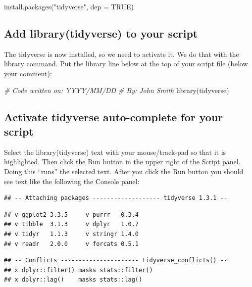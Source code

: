 \documentclass[
]{krantz}
\makeatletter
\newenvironment{Shaded}{\begin{snugshade}}{\end{snugshade}}
\newcommand{\AttributeTok}[1]{\textcolor[rgb]{0.61,0.61,0.61}{#1}}
\newcommand{\CommentTok}[1]{\textcolor[rgb]{0.37,0.37,0.37}{\textit{#1}}}
\newcommand{\ConstantTok}[1]{\textcolor[rgb]{0,0,0}{#1}}
\newcommand{\FunctionTok}[1]{\textcolor[rgb]{0,0,0}{#1}}
\newcommand{\NormalTok}[1]{#1}
\newcommand{\StringTok}[1]{\textcolor[rgb]{0.5,0.5,0.5}{#1}}
\newenvironment{kframe}{%
\medskip{}
\setlength{\fboxsep}{.8em}
 \def\at@end@of@kframe{}%
 \ifinner\ifhmode%
  \def\at@end@of@kframe{\end{minipage}}%
  \begin{minipage}{\columnwidth}%
 \fi\fi%
 \def\FrameCommand##1{\hskip\@totalleftmargin \hskip-\fboxsep
 \colorbox{shadecolor}{##1}\hskip-\fboxsep
     \hskip-\linewidth \hskip-\@totalleftmargin \hskip\columnwidth}%
 \MakeFramed {\advance\hsize-\width
   \@totalleftmargin\z@ \linewidth\hsize
   \@setminipage}}%
 {\par\unskip\endMakeFramed%
 \at@end@of@kframe}
\renewenvironment{Shaded}{\begin{kframe}}{\end{kframe}}
\makeatother
\begin{document}
\begin{Shaded}
\begin{Highlighting}[]
\FunctionTok{install.packages}\NormalTok{(}\StringTok{"tidyverse"}\NormalTok{, }\AttributeTok{dep =} \ConstantTok{TRUE}\NormalTok{)}
\end{Highlighting}
\end{Shaded}

\hypertarget{add-librarytidyverse-to-your-script}{%
\subsection{Add library(tidyverse) to your script}\label{add-librarytidyverse-to-your-script}}

The tidyverse is now installed, so we need to activate it. We do that with the library command. Put the library line below at the top of your script file (below your comment):

\begin{Shaded}
\begin{Highlighting}[]
\CommentTok{\# Code written on: YYYY/MM/DD }
\CommentTok{\# By: John Smith}
\FunctionTok{library}\NormalTok{(tidyverse)}
\end{Highlighting}
\end{Shaded}

\hypertarget{activate-tidyverse-auto-complete-for-your-script}{%
\subsection{Activate tidyverse auto-complete for your script}\label{activate-tidyverse-auto-complete-for-your-script}}

Select the library(tidyverse) text with your mouse/track-pad so that it is highlighted. Then click the Run button in the upper right of the Script panel. Doing this ``runs'' the selected text. After you click the Run button you should see text like the following the Console panel:

\begin{verbatim}
## -- Attaching packages ------------------- tidyverse 1.3.1 --
\end{verbatim}

\begin{verbatim}
## v ggplot2 3.3.5     v purrr   0.3.4
## v tibble  3.1.3     v dplyr   1.0.7
## v tidyr   1.1.3     v stringr 1.4.0
## v readr   2.0.0     v forcats 0.5.1
\end{verbatim}

\begin{verbatim}
## -- Conflicts ---------------------- tidyverse_conflicts() --
## x dplyr::filter() masks stats::filter()
## x dplyr::lag()    masks stats::lag()
\end{verbatim}
\end{document}
